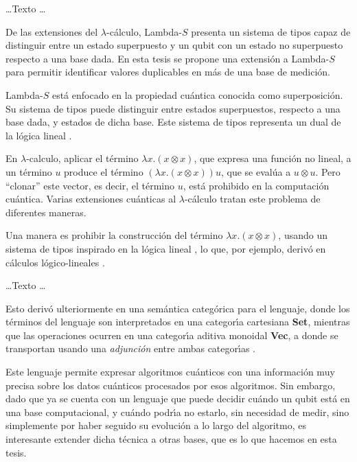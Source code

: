 \begin{center}
	\ldots Texto \ldots
\end{center}

De las extensiones del \(\lambda\)-c\'alculo, Lambda-\(S\) \parencite{DiazcaroDowekRinaldi2019, DiazcaroMalherbe2024} presenta un sistema de tipos capaz de distinguir
entre un estado superpuesto y un qubit con un estado no superpuesto respecto a una base dada. En esta tesis se propone
una extensi\'on a Lambda-\(S\) para permitir identificar valores duplicables en m\'as de una base de medici\'on.

Lambda-\(S\) est\'a enfocado en la propiedad cu\'antica conocida como superposici\'on. Su sistema de tipos puede distinguir entre estados superpuestos, respecto a una base dada, y estados de dicha base. Este sistema de tipos representa un dual de la l\'ogica lineal \parencite{DiazcaroMalherbe2020}.

En \(\lambda\)-calculo, aplicar el t\'ermino \(\lambda x.(x \otimes x)\), que expresa una funci\'on no lineal, a un t\'ermino \(u\) produce el t\'ermino \((\lambda x.(x \otimes x))u\), que se eval\'ua a \(u
	\otimes u\). Pero \enquote{clonar} este vector, es decir, el t\'ermino \(u\), est\'a prohibido en la computaci\'on cu\'antica.
Varias extensiones cu\'anticas al \(\lambda\)-c\'alculo tratan este problema de diferentes maneras.

Una manera es prohibir la construcci\'on del t\'ermino \(\lambda x.(x \otimes x)\), usando un sistema de tipos inspirado en la l\'ogica lineal
\parencite{Girard1987,Abramsky1993}, lo que, por ejemplo, deriv\'o en c\'alculos l\'ogico-lineales 
\parencite{	AltenkirchGrattage2005,
	SelingerValiron2009,
	GreenEtAl2013,
	PaganiSelingerValiron2014,
	Zorzi2016}.

\begin{center}
	\ldots Texto \ldots
\end{center}

Esto deriv\'o ulteriormente en una sem\'antica categ\'orica para el lenguaje, donde los t\'erminos del lenguaje son interpretados en una categor\'{\i}a cartesiana \textbf{Set}, mientras que las operaciones ocurren en una categor\'{\i}a aditiva monoidal \textbf{Vec}, a donde se transportan usando una \emph{adjunci\'on} entre ambas categor\'{\i}as \parencite{DiazcaroMalherbe2024, DiazcaroMalherbe2020}.

Este lenguaje permite expresar algoritmos cu\'anticos con una informaci\'on muy precisa sobre los datos cu\'anticos procesados por esos algoritmos. Sin embargo, dado que ya se cuenta con un lenguaje que puede decidir cu\'ando un qubit est\'a en una base computacional, y cu\'ando podr\'{\i}a no estarlo, sin necesidad de medir, sino simplemente por haber seguido su evoluci\'on a lo largo del algoritmo, es interesante extender dicha t\'ecnica a otras bases, que es lo que hacemos en esta tesis.

